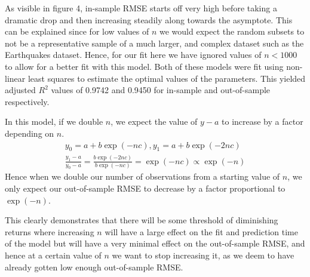 \documentclass[11pt,twoside,a4paper]{article}
\begin{document}
As visible in figure 4, in-sample RMSE starts off very high before taking a dramatic drop and then increasing steadily along towards the asymptote. This can be explained since for low values of $n$ we would expect the random subsets to not be a representative sample of a much larger, and complex dataset such as the Earthquakes dataset. Hence, for our fit here we have ignored values of $n<1000$ to allow for a better fit with this model. Both of these models were fit using non-linear least squares to estimate the optimal values of the parameters. This yielded adjusted $R^2$ values of 0.9742 and 0.9450 for in-sample and out-of-sample respectively.

In this model, if we double $n$, we expect the value of $y-a$ to increase by a factor depending on $n$.
\begin{align}
y_0 = a+b\exp(-nc), y_1=a+b\exp(-2nc)\\
\frac{y_1 - a}{y_0 - a} = \frac{b\exp(-2nc)}{b\exp(-nc)}=\exp(-nc)\propto \exp(-n)
\end{align}
Hence when we double our number of observations from a starting value of $n$, we only expect our out-of-sample RMSE to decrease by a factor proportional to $\exp(-n)$.

This clearly demonstrates that there will be some threshold of diminishing returns where increasing $n$ will have a large effect on the fit and prediction time of the model but will have a very minimal effect on the out-of-sample RMSE, and hence at a certain value of $n$ we want to stop increasing it, as we deem to have already gotten low enough out-of-sample RMSE.
\newpage

\end{document}
